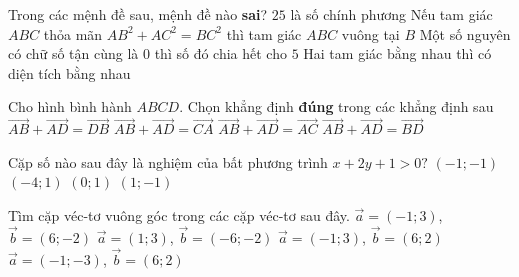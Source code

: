 \begin{ex}%
	Trong các mệnh đề sau, mệnh đề nào \textbf{sai}?
	\choice
	{$25$ là số chính phương}
	{\True Nếu tam giác $ABC$ thỏa mãn $AB^2+AC^2=BC^2$ thì tam giác $ABC$ vuông tại $B$}
	{Một số nguyên có chữ số tận cùng là $0$ thì số đó chia hết cho $5$}
	{Hai tam giác bằng nhau thì có diện tích bằng nhau}
\end{ex}


\begin{ex}%
	Cho hình bình hành $ABCD$. Chọn khẳng định \textbf{đúng} trong các khẳng định sau
	\choice
	{$\overrightarrow{AB}+\overrightarrow{AD}=\overrightarrow{DB}$}
	{$\overrightarrow{AB}+\overrightarrow{AD}=\overrightarrow{CA}$}
	{\True $\overrightarrow{AB}+\overrightarrow{AD}=\overrightarrow{AC}$}
	{$\overrightarrow{AB}+\overrightarrow{AD}=\overrightarrow{BD}$}
\end{ex}


\begin{ex}%
	Cặp số nào sau đây là nghiệm của bất phương trình $x+2y+1>0?$
	\choice
	{$(-1;-1)$}
	{$(-4;1)$}
	{\True $(0;1)$}
	{$(1;-1)$}
\end{ex}


\begin{ex}%
	Tìm cặp véc-tơ vuông góc trong các cặp véc-tơ sau đây.
	\choice
	{$\overrightarrow{a}=(-1;3)$, $\overrightarrow{b}=(6;-2)$}
	{$\overrightarrow{a}=(1;3)$, $\overrightarrow{b}=(-6;-2)$}
	{\True $\overrightarrow{a}=(-1;3)$, $\overrightarrow{b}=(6;2)$}
	{$\overrightarrow{a}=(-1;-3)$, $\overrightarrow{b}=(6;2)$}
\end{ex}


